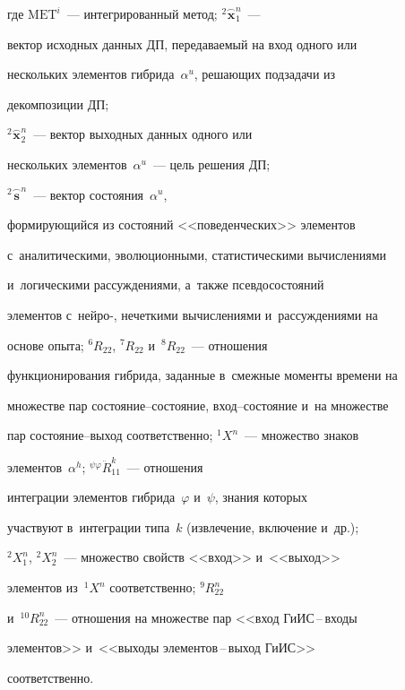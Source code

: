 \vspace*{-4pt}



\noindent

где $\mathrm{MET}^i$~--- интегрированный метод; ${}^2\overset{\frown}{\mathbf{x}}_1^n$~--- 

вектор исходных данных ДП, пе\-ре\-да\-ва\-емый на вход одного или 

нескольких элементов гиб\-ри\-да~$\alpha^u$, ре\-ша\-ющих подзадачи из 

декомпозиции ДП;  

${}^2\overset{\frown}{\mathbf{x}}_2^n$~--- вектор выходных данных одного или 

нескольких элементов~$\alpha^u$~--- цель решения ДП; 

${}^2\overset{\frown}{\mathbf{s}}^n$~--- вектор со\-сто\-яния~$\alpha^u$, 

формирующийся из со\-сто\-яний <<поведенческих>> элементов 

с~аналитическими, эволюционными, статистическими вычислениями 

и~логическими рас\-суж\-де\-ни\-ями, а~так\-же псев\-до\-со\-сто\-яний 

элементов с~ней\-ро-, нечеткими вы\-чис\-ле\-ни\-ями и~рассуждениями на 

основе опыта; ${}^6 R_{22}$, ${}^7 R_{22}$ и~${}^8 R_{22}$~--- отношения 

функционирования гиб\-ри\-да, заданные в~смежные моменты времени на 

множестве пар со\-сто\-яние--со\-сто\-яние, вход--со\-сто\-яние и~на множестве 

пар со\-сто\-яние--вы\-ход соответственно; ${}^1X^n$~--- множество знаков 

элементов~$\alpha^h$; ${}^{\psi\varphi}\ddot{R}^k_{11}$~--- отношения 

интеграции элементов гиб\-ри\-да~$\varphi$ и~$\psi$, знания которых  

участ\-ву\-ют в~интеграции типа~$k$ (извлечение, включение и~др.); 

${}^2X_1^n$, ${}^2X_2^n$~--- множество свойств <<вход>> и~<<выход>> 

элементов из~${}^1X^n$ соответственно; ${}^9R^n_{22}$ 

и~${}^{10}R^n_{22}$~--- отношения на множестве пар <<вход \mbox{ГиИС}\,--\,вхо\-ды 

элементов>> и~<<выходы эле\-мен\-тов\,--\,вы\-ход \mbox{ГиИС}>> 

соответственно.


